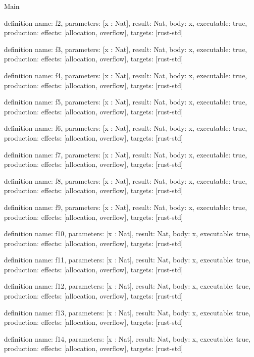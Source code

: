 \begin{lexlean}{Main}
\begin{semanticmodule}
definition{
  name: f2,
  parameters: [x : Nat],
  result: Nat,
  body: x,
  executable: true,
  production: {effects: [allocation, overflow], targets: [rust-std]}
}

definition{
  name: f3,
  parameters: [x : Nat],
  result: Nat,
  body: x,
  executable: true,
  production: {effects: [allocation, overflow], targets: [rust-std]}
}

definition{
  name: f4,
  parameters: [x : Nat],
  result: Nat,
  body: x,
  executable: true,
  production: {effects: [allocation, overflow], targets: [rust-std]}
}

definition{
  name: f5,
  parameters: [x : Nat],
  result: Nat,
  body: x,
  executable: true,
  production: {effects: [allocation, overflow], targets: [rust-std]}
}

definition{
  name: f6,
  parameters: [x : Nat],
  result: Nat,
  body: x,
  executable: true,
  production: {effects: [allocation, overflow], targets: [rust-std]}
}

definition{
  name: f7,
  parameters: [x : Nat],
  result: Nat,
  body: x,
  executable: true,
  production: {effects: [allocation, overflow], targets: [rust-std]}
}

definition{
  name: f8,
  parameters: [x : Nat],
  result: Nat,
  body: x,
  executable: true,
  production: {effects: [allocation, overflow], targets: [rust-std]}
}

definition{
  name: f9,
  parameters: [x : Nat],
  result: Nat,
  body: x,
  executable: true,
  production: {effects: [allocation, overflow], targets: [rust-std]}
}

definition{
  name: f10,
  parameters: [x : Nat],
  result: Nat,
  body: x,
  executable: true,
  production: {effects: [allocation, overflow], targets: [rust-std]}
}

definition{
  name: f11,
  parameters: [x : Nat],
  result: Nat,
  body: x,
  executable: true,
  production: {effects: [allocation, overflow], targets: [rust-std]}
}

definition{
  name: f12,
  parameters: [x : Nat],
  result: Nat,
  body: x,
  executable: true,
  production: {effects: [allocation, overflow], targets: [rust-std]}
}

definition{
  name: f13,
  parameters: [x : Nat],
  result: Nat,
  body: x,
  executable: true,
  production: {effects: [allocation, overflow], targets: [rust-std]}
}

definition{
  name: f14,
  parameters: [x : Nat],
  result: Nat,
  body: x,
  executable: true,
  production: {effects: [allocation, overflow], targets: [rust-std]}
}


\end{semanticmodule}
\end{lexlean}
